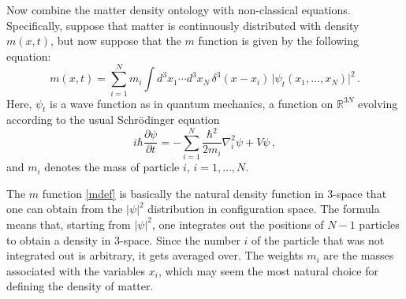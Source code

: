 \documentclass[12pt]{article}
\newcommand{\RRR}{\mathbb{R}}
\begin{document}
Now combine the matter density ontology with non-classical equations. Specifically, suppose that matter is continuously distributed with density $m(x,t)$, but now suppose that the $m$ function is given by the following equation:
\begin{equation}\label{mdef}
  m(x,t) = \sum_{i=1}^N m_i \int d^3x_1 \cdots d^3x_N \, \delta^3(x-x_i) \, 
  \bigl|\psi_t(x_1,\ldots, x_N) \bigr|^2\,.
\end{equation}
Here, $\psi_t$ is a wave function as in quantum mechanics, a function on $\RRR^{3N}$ evolving according to the usual Schr\"odinger equation
\begin{equation}\label{Schr}
  i\hbar \frac{\partial \psi}{\partial t} = 
  - \sum_{i=1}^N \frac{\hbar^2}{2m_i} \nabla_i^2 \psi + V \psi\,,
\end{equation}
and $m_i$ denotes the mass of particle $i$, $i= 1, \ldots, N$.

The $m$ function \eqref{mdef} is basically the natural density function in 3-space that one can obtain from the $|\psi|^2$ distribution in configuration space. The formula means that, starting from $|\psi|^2$, one integrates out the positions of $N-1$ particles to obtain a density in 3-space. Since the number $i$ of the particle that was not integrated out is arbitrary, it gets averaged over. The weights $m_i$ are the masses associated with the variables $x_i$, which may seem the most natural choice for defining the density of matter.
\end{document}
